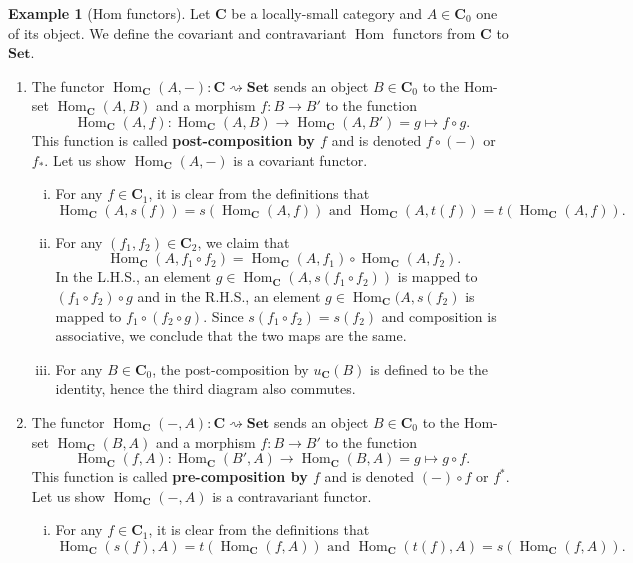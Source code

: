 \documentclass{article}
\theoremstyle{definition}
\newtheorem{exmp}[thm]{Example}
\theoremstyle{remark}
\DeclareMathOperator{\Hom}{Hom}
\begin{document}
\begin{exmp}[Hom functors]
	Let $\mathbf{C}$ be a locally-small category and $A \in \mathbf{C}_0$ one of its object. We define the covariant and contravariant $\Hom$ functors from $\mathbf{C}$ to $\textbf{Set}$.
	\begin{enumerate}
		\item The functor $\Hom_{\mathbf{C}}(A,-): \mathbf{C} \rightsquigarrow \textbf{Set}$ sends an object $B\in \mathbf{C}_0$ to the Hom-set $\Hom_{\mathbf{C}}(A,B)$ and a morphism $f:B\rightarrow B'$ to the function $$\Hom_{\mathbf{C}}(A,f): \Hom_{\mathbf{C}}(A,B) \rightarrow \Hom_{\mathbf{C}}(A,B') = g \mapsto f\circ g.$$
		This function is called \textbf{post-composition by $f$} and is denoted $f \circ (-)$ or $f_{*}$. Let us show $\Hom_{\mathbf{C}}(A, -)$ is a covariant functor.
		\begin{enumerate}[i.]
			\item For any $f \in \mathbf{C}_1$, it is clear from the definitions that \[\Hom_{\mathbf{C}}(A,s(f)) = s(\Hom_{\mathbf{C}}(A,f)) \text{ and } \Hom_{\mathbf{C}}(A,t(f)) = t(\Hom_{\mathbf{C}}(A,f)).\]
			\item For any $(f_1,f_2) \in \mathbf{C}_2$, we claim that \[\Hom_{\mathbf{C}}(A,f_1\circ f_2) = \Hom_{\mathbf{C}}(A,f_1)\circ \Hom_{\mathbf{C}}(A,f_2).\] In the L.H.S., an element $g \in \Hom_{\mathbf{C}}(A,s(f_1\circ f_2))$ is mapped to $(f_1 \circ f_2) \circ g$ and in the R.H.S., an element $g \in \Hom_{\mathbf{C}}(A,s(f_2)$ is mapped to $f_1\circ (f_2 \circ g)$. Since $s(f_1 \circ f_2) = s(f_2)$ and composition is associative, we conclude that the two maps are the same.
			\item For any $B \in \mathbf{C}_0$, the post-composition by $u_{\mathbf{C}}(B)$ is defined to be the identity, hence the third diagram also commutes.
		\end{enumerate}
		\item The functor $\Hom_{\mathbf{C}}(-,A): \mathbf{C} \rightsquigarrow \textbf{Set}$ sends an object $B\in \mathbf{C}_0$ to the Hom-set $\Hom_{\mathbf{C}}(B,A)$ and a morphism $f:B\rightarrow B'$ to the function $$\Hom_{\mathbf{C}}(f,A): \Hom_{\mathbf{C}}(B',A) \rightarrow \Hom_{\mathbf{C}}(B,A) = g \mapsto g\circ f.$$
		This function is called \textbf{pre-composition by $f$} and is denoted $(-) \circ f$ or $f^*$. Let us show $\Hom_{\mathbf{C}}(-,A)$ is a contravariant functor.
		\begin{enumerate}[i.]
			\item For any $f \in \mathbf{C}_1$, it is clear from the definitions that \[\Hom_{\mathbf{C}}(s(f),A) = t(\Hom_{\mathbf{C}}(f,A))\text{ and } \Hom_{\mathbf{C}}(t(f),A) = s(\Hom_{\mathbf{C}}(f,A)).\]

\end{enumerate}
\end{enumerate}
\end{exmp}
\end{document}
